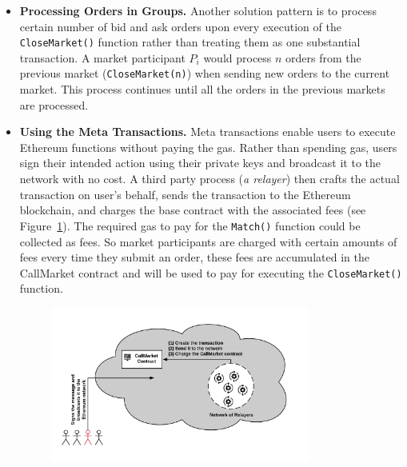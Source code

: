 \begin{itemize}
\begin{itemize}
\item \textbf{Processing Orders in Groups.} Another solution pattern is to process certain number of bid and ask orders upon every execution of the \texttt{CloseMarket()} function rather than treating them as one substantial transaction. A market participant $P_i$ would process $n$ orders from the previous market (\texttt{CloseMarket(n)}) when sending new orders to the current market. This process continues until all the orders in the previous markets are processed. %

\item \textbf {Using the Meta Transactions.} Meta transactions enable users to execute Ethereum functions without paying the gas. Rather than spending gas, users sign their intended action using their private keys and broadcast it to the network with no cost. A third party process (\textit{a relayer}) then crafts the actual transaction on user's behalf, sends the transaction to the Ethereum blockchain, and charges the base contract with the associated fees (see Figure~\ref{fig:meta_tx}). The required gas to pay for the \texttt{Match()} function could be collected as fees. So market participants are charged with certain amounts of fees every time they submit an order, these fees are accumulated in the CallMarket contract and will be used to pay for executing the \texttt{CloseMarket()} function.

% 


\begin{figure}[htb!p]
\centering
\includegraphics[width=0.8\textwidth]{fig/meta_tx.png}
\caption{\footnotesize{}  \label{fig:meta_tx}}
\end{figure}


\end{itemize}
\end{itemize}

